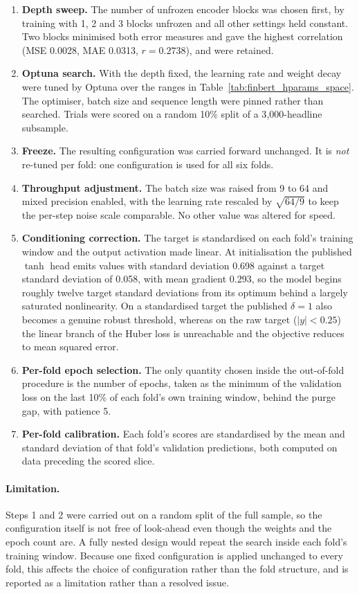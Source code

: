 \begin{enumerate}
\item \textbf{Depth sweep.} The number of unfrozen encoder blocks was chosen first, by
      training with 1, 2 and 3 blocks unfrozen and all other settings held constant.
      Two blocks minimised both error measures and gave the highest correlation
      (MSE 0.0028, MAE 0.0313, $r = 0.2738$), and were retained.
\item \textbf{Optuna search.} With the depth fixed, the learning rate and weight decay
      were tuned by Optuna over the ranges in Table~\ref{tab:finbert_hparams_space}.
      The optimiser, batch size and sequence length were pinned rather than searched.
      Trials were scored on a random 10\% split of a 3{,}000-headline subsample.
\item \textbf{Freeze.} The resulting configuration was carried forward unchanged. It is
      \emph{not} re-tuned per fold: one configuration is used for all six folds.
\item \textbf{Throughput adjustment.} The batch size was raised from 9 to 64 and mixed
      precision enabled, with the learning rate rescaled by $\sqrt{64/9}$ to keep the
      per-step noise scale comparable. No other value was altered for speed.
\item \textbf{Conditioning correction.} The target is standardised on each fold's
      training window and the output activation made linear. At initialisation the
      published $\tanh$ head emits values with standard deviation 0.698 against a
      target standard deviation of 0.058, with mean gradient 0.293, so the model
      begins roughly twelve target standard deviations from its optimum behind a
      largely saturated nonlinearity. On a standardised target the published
      $\delta = 1$ also becomes a genuine robust threshold, whereas on the raw target
      ($|y| < 0.25$) the linear branch of the Huber loss is unreachable and the
      objective reduces to mean squared error.
\item \textbf{Per-fold epoch selection.} The only quantity chosen inside the
      out-of-fold procedure is the number of epochs, taken as the minimum of the
      validation loss on the last 10\% of each fold's own training window, behind the
      purge gap, with patience 5.
\item \textbf{Per-fold calibration.} Each fold's scores are standardised by the mean
      and standard deviation of that fold's validation predictions, both computed on
      data preceding the scored slice.
\end{enumerate}

\paragraph{Limitation.} Steps 1 and 2 were carried out on a random split of the full
sample, so the configuration itself is not free of look-ahead even though the weights
and the epoch count are. A fully nested design would repeat the search inside each
fold's training window. Because one fixed configuration is applied unchanged to every
fold, this affects the choice of configuration rather than the fold structure, and is
reported as a limitation rather than a resolved issue.
